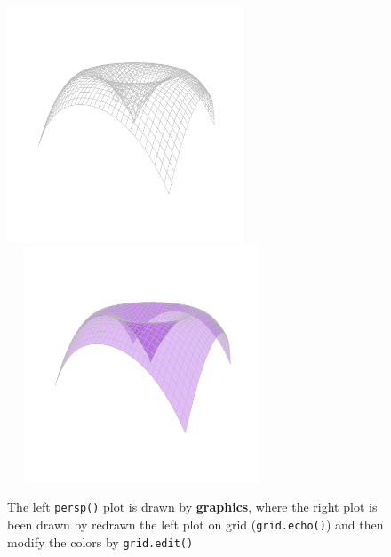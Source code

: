 \documentclass{report}
\begin{document}
\begin{figure}[h]
	\begin{center}
		\includegraphics[height = 7cm, width = 7cm]{figure/Chapter6_example_1_2.pdf}
		\includegraphics[height = 7cm, width = 8cm]{figure/Chapter6_example_1_3.pdf}
		\caption{The left \texttt{persp()} plot is drawn by \textbf{graphics}, where the right plot is been drawn by redrawn the left plot on grid (\texttt{grid.echo()}) and then modify the colors by \texttt{grid.edit()}}
		\label{Example_6.3}
	\end{center}
\end{figure}
\end{document}
